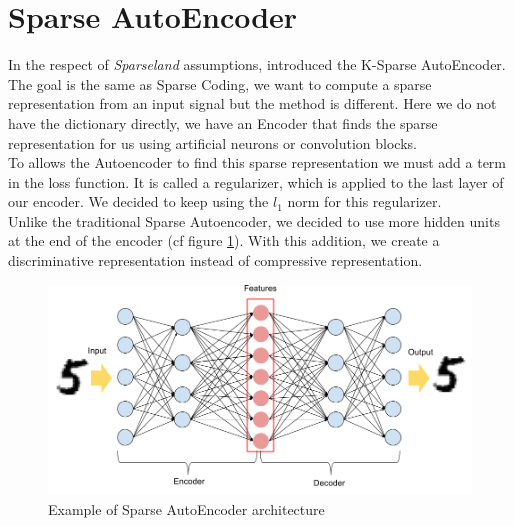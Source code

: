 \section{Sparse AutoEncoder}
In the respect of \textit{Sparseland} assumptions, \cite{DBLP:journals/corr/MakhzaniF13} introduced the K-Sparse AutoEncoder. The goal is the same as Sparse Coding, we want to compute a sparse representation from an input signal but the method is different. Here we do not have the dictionary directly, we have an Encoder that finds the sparse representation for us using artificial neurons or convolution blocks.\\
To allows the Autoencoder to find this sparse representation we must add a term in the loss function. It is called a regularizer, which is applied to the last layer of our encoder. We decided to keep using the $l_1$ norm for this regularizer.\\ 
Unlike the traditional Sparse Autoencoder, we decided to use more hidden units at the end of the encoder (cf figure \ref{fig:SAE}). With this addition, we create a discriminative representation instead of compressive representation.\\
\begin{figure}[h]
 \centering
 \includegraphics[scale=0.5]{sparse_AutoEncoder.png}
 \caption{Example of Sparse AutoEncoder architecture}
 \label{fig:SAE}
\end{figure}

\newpage
